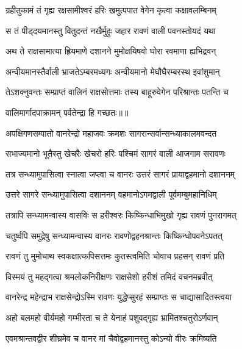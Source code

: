 \twolineshloka
{ग्रहीतुकामं तं गृह्य रक्षसामीश्वरं हरिः}
{खमुत्पपात वेगेन कृत्वा कक्षावलम्बिनम्} %

\twolineshloka
{स तं पीड्दयमानस्तु वितुदन्तं नखैर्मुहुः}
{जहार रावणं वाली पवनस्तोयदं यथा} %

\twolineshloka
{अथ ते राक्षसामात्या ह्रियमाणे दशानने}
{मुमोक्षयिषवो घोरा रवमाणा ह्यभिद्रवन्} %

\twolineshloka
{अन्वीयमानस्तैर्वाली भ्राजतेऽम्बरमध्यगः}
{अन्वीयमानो मेघौघैरम्बरस्थ इवांशुमान्} %

\twolineshloka
{तेऽशक्नुवन्तः सम्प्राप्तं वालिनं राक्षसोत्तमाः}
{तस्य बाहूरुवेगेन परिश्रान्तः पतन्ति च} %

{वालिमार्गादपाक्रामन् पर्वतेन्द्रा हि गच्छतः॥॥} %

\addtocounter{shlokacount}{1}

\twolineshloka
{अपक्षिगणसम्पातो वानरेन्द्रो महाजवः}
{क्रमशः सागरान्सर्वान्सन्ध्याकालमवन्दत} %

\twolineshloka
{सभाज्यमानो भूतैस्तु खेचरैः खेचरो हरिः}
{पश्चिमं सागरं वाली आजगाम सरावणः} %

\twolineshloka
{तत्र सन्ध्यामुपासित्वा स्नात्वा जप्त्वा च वानरः}
{उत्तरं सागरं प्रायाद्वहमानो दशाननम्} %

\twolineshloka
{उत्तरे सागरे सन्ध्यामुपासित्वा दशाननम्}
{वहमानोऽगमद्वाली पूर्वमम्बुमहानिधिम्} %

\twolineshloka
{तत्रापि सन्ध्यामन्वास्य वासविः स हरीश्वरः}
{किष्किन्धाभिमुखो गृह्य रावणं पुनरागमत्} %

\twolineshloka
{चतुर्ष्वपि समुद्रेषु सन्ध्यामन्वास्य वानरः}
{रावणोद्वहनश्रान्तः किष्किन्धोपवनेऽपतत्} %

\twolineshloka
{रावणं तु मुमोचाथ स्वकक्षात्कपिसत्तमः}
{कुतस्त्वमिति चोवाच प्रहसन् रावणं प्रति} %

\twolineshloka
{विस्मयं तु महद्गत्वा श्रमलोकनिरीक्षणः}
{राक्षसेशो हरीशं तमिदं वचनमब्रवीत्} %

\twolineshloka
{वानरेन्द्र महेन्द्राभ राक्षसेन्द्रोऽस्मि रावणः}
{युद्धेप्सुरहं सम्प्राप्तः स चाद्यासादितस्त्वया} %

\twolineshloka
{अहो बलमहो वीर्यमहो गम्भीरता च ते}
{येनाहं पशुवद्गृह्य भ्रामितश्चतुरोऽर्णवान्} %

\twolineshloka
{एवमश्रान्तवद्वीर शीघ्रमेव च वानर}
{मां चैवोद्वहमानस्तु कोऽन्यो वीरः क्रमिष्यति} %

